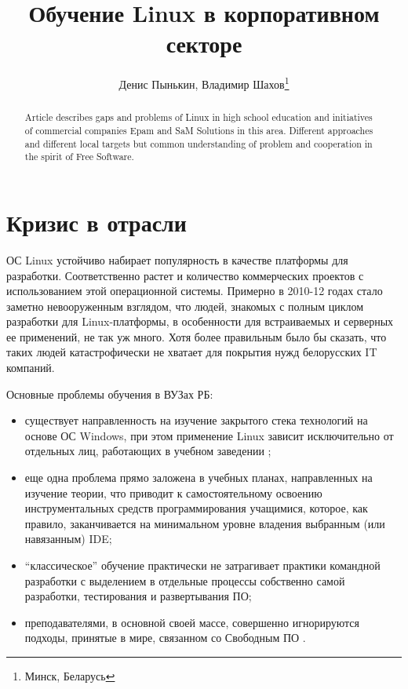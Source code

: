 \documentclass[10pt, a5paper]{article}
\begin{document}
\title{Обучение Linux в корпоративном секторе}
\author{Денис Пынькин, Владимир Шахов\footnote{Минск, Беларусь}}
\maketitle
\begin{abstract}
Article describes gaps and problems of Linux in high school education and initiatives of commercial companies Epam and SaM Solutions in this area. Different approaches and different local targets but common understanding of problem and cooperation in the spirit of Free Software.
\end{abstract}
\section*{Кризис в отрасли}

ОС Linux устойчиво набирает популярность в качестве платформы для разработки. Соответственно растет и количество коммерческих проектов с использованием этой операционной системы. Примерно в 2010-12 годах стало заметно невооруженным взглядом, что людей, знакомых с полным циклом разработки
для Linux-платформы, в особенности для встраиваемых и серверных ее применений, не так уж много. Хотя более правильным было бы сказать, что таких людей катастрофически не хватает для покрытия нужд белорусских IT компаний.

Основные проблемы обучения в ВУЗах РБ:

\begin{itemize}
  \item существует направленность на изучение закрытого стека технологий на основе ОС Windows, при этом применение Linux зависит исключительно от отдельных лиц, работающих в учебном заведении \cite{bib1};
  \item еще одна проблема прямо заложена в учебных планах, направленных на изучение теории, что приводит к самостоятельному освоению инструментальных средств программирования учащимися, которое, как правило, заканчивается на минимальном уровне владения выбранным (или навязанным) IDE;
  \item “классическое” обучение практически не затрагивает практики командной разработки с выделением в отдельные процессы собственно самой разработки, тестирования и развертывания ПО;
  \item преподавателями, в основной своей массе, совершенно игнорируются подходы, принятые в мире, связанном со Свободным ПО \cite{bib2}.
\end{itemize}
\end{document}
